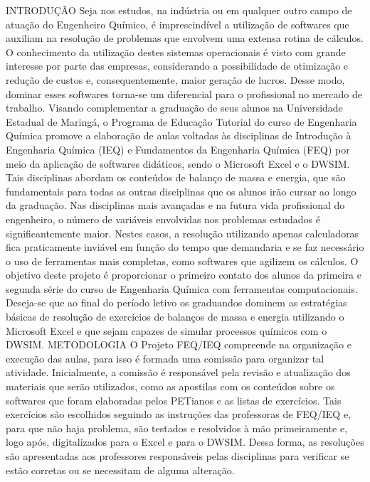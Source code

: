 INTRODUÇÃO
Seja nos estudos, na indústria ou em qualquer outro campo de atuação do Engenheiro 
Químico, é imprescindível a utilização de softwares que auxiliam na resolução de problemas que 
envolvem uma extensa rotina de cálculos. O conhecimento da utilização destes sistemas 
operacionais é visto com grande interesse por parte das empresas, considerando a possibilidade de 
otimização e redução de custos e, consequentemente, maior geração de lucros. Desse modo, 
dominar esses softwares torna-se um diferencial para o profissional no mercado de trabalho.
Visando complementar a graduação de seus alunos na Universidade Estadual de Maringá, 
o Programa de Educação Tutorial do curso de Engenharia Química promove a elaboração de aulas 
voltadas às disciplinas de Introdução à Engenharia Química (IEQ) e Fundamentos da Engenharia 
Química (FEQ) por meio da aplicação de softwares didáticos, sendo o Microsoft Excel e o DWSIM.
Tais disciplinas abordam os conteúdos de balanço de massa e energia, que são 
fundamentais para todas as outras disciplinas que os alunos irão cursar ao longo da graduação. Nas 
disciplinas mais avançadas e na futura vida profissional do engenheiro, o número de variáveis 
envolvidas nos problemas estudados é significantemente maior. Nestes casos, a resolução 
utilizando apenas calculadoras fica praticamente inviável em função do tempo que demandaria e 
se faz necessário o uso de ferramentas mais completas, como softwares que agilizem os cálculos.
O objetivo deste projeto é proporcionar o primeiro contato dos alunos da primeira e 
segunda série do curso de Engenharia Química com ferramentas computacionais. Deseja-se que 
ao final do período letivo os graduandos dominem as estratégias básicas de resolução de exercícios 
de balanços de massa e energia utilizando o Microsoft Excel e que sejam capazes de simular 
processos químicos com o DWSIM.
METODOLOGIA
 O Projeto FEQ/IEQ compreende na organização e execução das aulas, para isso é formada 
uma comissão para organizar tal atividade. Inicialmente, a comissão é responsável pela revisão e 
atualização dos materiais que serão utilizados, como as apostilas com os conteúdos sobre os 
softwares que foram elaboradas pelos PETianos e as listas de exercícios. Tais exercícios são 
escolhidos seguindo as instruções das professoras de FEQ/IEQ e, para que não haja problema, são
testados e resolvidos à mão primeiramente e, logo após, digitalizados para o Excel e para o 
DWSIM. Dessa forma, as resoluções são apresentadas aos professores responsáveis pelas 
disciplinas para verificar se estão corretas ou se necessitam de alguma alteração.
